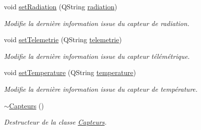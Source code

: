 \begin{DoxyCompactItemize}
void \hyperlink{class_capteurs_a8692d145188df3129d88fef77efbb7b0}{set\+Radiation} (Q\+String \hyperlink{class_capteurs_ad9d6f3fd6cc164c6cd5908fd7822f307}{radiation})
\begin{DoxyCompactList}\small\item\em Modifie la dernière information issue du capteur de radiation. \end{DoxyCompactList}\item 
void \hyperlink{class_capteurs_a399af986afb9d707138bc57a51e1f34f}{set\+Telemetrie} (Q\+String \hyperlink{class_capteurs_a336a4c4ad6ae1a49d21b265d2953e24b}{telemetrie})
\begin{DoxyCompactList}\small\item\em Modifie la dernière information issue du capteur télémétrique. \end{DoxyCompactList}\item 
void \hyperlink{class_capteurs_a8d6a0bceb4d236edf7b51335d9be8ecd}{set\+Temperature} (Q\+String \hyperlink{class_capteurs_acf6f97c1e121ae0f53c9a56430d42dfe}{temperature})
\begin{DoxyCompactList}\small\item\em Modifie la dernière information issue du capteur de température. \end{DoxyCompactList}\item 
\hyperlink{class_capteurs_a8d0e38fada71279279b2d3938485304b}{$\sim$\+Capteurs} ()
\begin{DoxyCompactList}\small\item\em Destructeur de la classe \hyperlink{class_capteurs}{Capteurs}. \end{DoxyCompactList}\end{DoxyCompactItemize}
